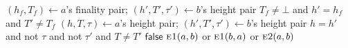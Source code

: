 \label{alg:fg-slashing}
\nopagebreak
{\footnotesize
\begin{algorithmic}[1]
  \State $(h_f,T_f)\gets a$'s finality pair;\quad
    $(h',T',\tau')\gets b$'s height pair
  \State \Return $T_f\neq\bot$ and $h'=h_f$ and $T'\neq T_f$
\EndFunction
\vspace{1pt}
  \State $(h,T,\tau)\gets a$'s height pair;\quad
    $(h',T',\tau')\gets b$'s height pair
  \State \Return $h=h'$ and not $\tau$ and not $\tau'$ and $T\neq T'$
\EndFunction
\vspace{1pt}
   \State \Return $\mathsf{false}$ \EndIf
  \State \Return $\Call{e1}{a,b}$ or $\Call{e1}{b,a}$ or $\Call{e2}{a,b}$
\EndFunction
\end{algorithmic}
}

